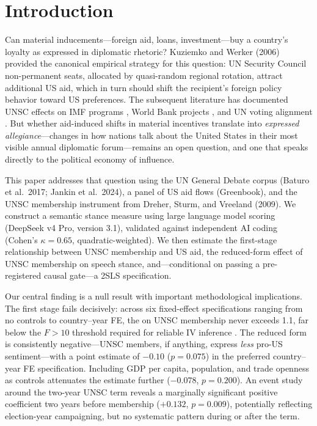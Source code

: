 \section{Introduction}\label{sec:introduction}

Can material inducements---foreign aid, loans, investment---buy a country's loyalty as expressed in diplomatic rhetoric? Kuziemko and Werker (2006) provided the canonical empirical strategy for this question: UN Security Council non-permanent seats, allocated by quasi-random regional rotation, attract additional US aid, which in turn should shift the recipient's foreign policy behavior toward US preferences. The subsequent literature has documented UNSC effects on IMF programs \citep{dreher2009global}, World Bank projects \citep{dreher2009development}, and UN voting alignment \citep{dreher2008does}. But whether aid-induced shifts in material incentives translate into \emph{expressed allegiance}---changes in how nations talk about the United States in their most visible annual diplomatic forum---remains an open question, and one that speaks directly to the political economy of influence.

This paper addresses that question using the UN General Debate corpus (Baturo et al.\ 2017; Jankin et al.\ 2024), a panel of US aid flows (Greenbook), and the UNSC membership instrument from Dreher, Sturm, and Vreeland (2009). We construct a semantic stance measure using large language model scoring (DeepSeek v4 Pro, version 3.1), validated against independent AI coding (Cohen's $\kappa = 0.65$, quadratic-weighted). We then estimate the first-stage relationship between UNSC membership and US aid, the reduced-form effect of UNSC membership on speech stance, and---conditional on passing a pre-registered causal gate---a 2SLS specification.

Our central finding is a null result with important methodological implications. The first stage fails decisively: across six fixed-effect specifications ranging from no controls to country--year FE, the \Fstat{} on UNSC membership never exceeds 1.1, far below the $F>10$ threshold required for reliable IV inference \citep{staiger1997instrumental}. The reduced form is consistently negative---UNSC members, if anything, express \emph{less} pro-US sentiment---with a point estimate of $-0.10$ ($p=0.075$) in the preferred country--year FE specification. Including GDP per capita, population, and trade openness as controls attenuates the estimate further ($-0.078$, $p=0.200$). An event study around the two-year UNSC term reveals a marginally significant positive coefficient two years before membership ($+0.132$, $p=0.009$), potentially reflecting election-year campaigning, but no systematic pattern during or after the term.

